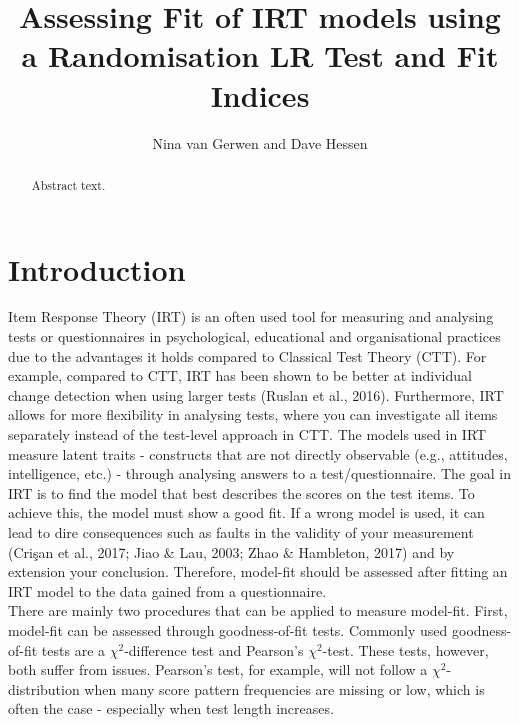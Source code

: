 \documentclass[Royal,sageapa,times,doublespace]{sagej}
\begin{document}

\title{Assessing Fit of IRT models using a Randomisation LR Test and Fit Indices}

\author{Nina van Gerwen  and Dave Hessen}




\begin{abstract}
Abstract text.
\end{abstract}


\maketitle

\section{Introduction}
Item Response Theory (IRT) is an often used tool for measuring and analysing tests or questionnaires in psychological, educational and organisational practices due to the advantages it holds compared to Classical Test Theory (CTT). For example, compared to CTT, IRT has been shown to be better at individual change detection when using larger tests (Ruslan et al., 2016). Furthermore, IRT allows for more flexibility in analysing tests, where you can investigate all items separately instead of the test-level approach in CTT. The models used in IRT measure latent traits - constructs that are not directly observable (e.g., attitudes, intelligence, etc.) - through analysing answers to a test/questionnaire. The goal in IRT is to find the model that best describes the scores on the test items. To achieve this, the model must show a good fit. If a wrong model is used, it can lead to dire consequences such as faults in the validity of your measurement (Cri\c{s}an et al., 2017; Jiao \& Lau, 2003; Zhao \& Hambleton, 2017) and by extension your conclusion. Therefore, model-fit should be assessed after fitting an IRT model to the data gained from a questionnaire. \\
\indent There are mainly two procedures that can be applied to measure model-fit. First, model-fit can be assessed through goodness-of-fit tests. Commonly used goodness-of-fit tests are a $\chi^2$-difference test and Pearson's $\chi^2$-test. These tests, however, both suffer from issues. Pearson's test, for example, will not follow a $\chi^2$-distribution when many score pattern frequencies are missing or low, which is often the case - especially when test length increases. 
\end{document}
